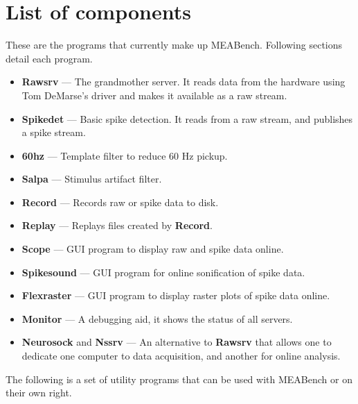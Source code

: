 \documentclass[12pt,oneside]{book}
\renewcommand{\sectionmark}[1]{}
\def\meabench{{MEABench}\xspace}
\def\prog#1{{\bf #1}}
\def\streamtype#1{{\sc #1}\xspace}
\def\raw{\streamtype{raw}}
\def\spike{\streamtype{spike}}
\begin{document}
\renewcommand{\sectionmark}[1]{\markright{#1}}
\chapter{List of components}

These are the programs that currently make up \meabench. Following
sections detail each program.

\begin{itemize}
\item \prog{Rawsrv} --- The grandmother server. It reads data from the
hardware using Tom DeMarse's driver and makes it available as a
\raw stream. 

\item \prog{Spikedet} --- Basic spike detection. It reads from a
\raw stream, and publishes a \spike stream.

\item \prog{60hz} --- Template filter to reduce 60 Hz pickup.

\item \prog{Salpa} --- Stimulus artifact filter.

\item \prog{Record} --- Records \raw or \spike data to
disk.

\item \prog{Replay} --- Replays files created by \prog{Record}.

\item \prog{Scope} --- GUI program to display \raw and \spike data
online.

\item \prog{Spikesound} --- GUI program for online sonification of \spike data.

\item \prog{Flexraster} --- GUI program to display raster plots of \spike 
data online.

\item \prog{Monitor} --- A debugging aid, it shows the status
of all servers.

\item \prog{Neurosock} and \prog{Nssrv} --- An alternative to
\prog{Rawsrv} that allows one to dedicate one computer to data
acquisition, and another for online analysis.
\end{itemize}

The following is a set of utility programs that can be used with
\meabench or on their own right.
\end{document}
